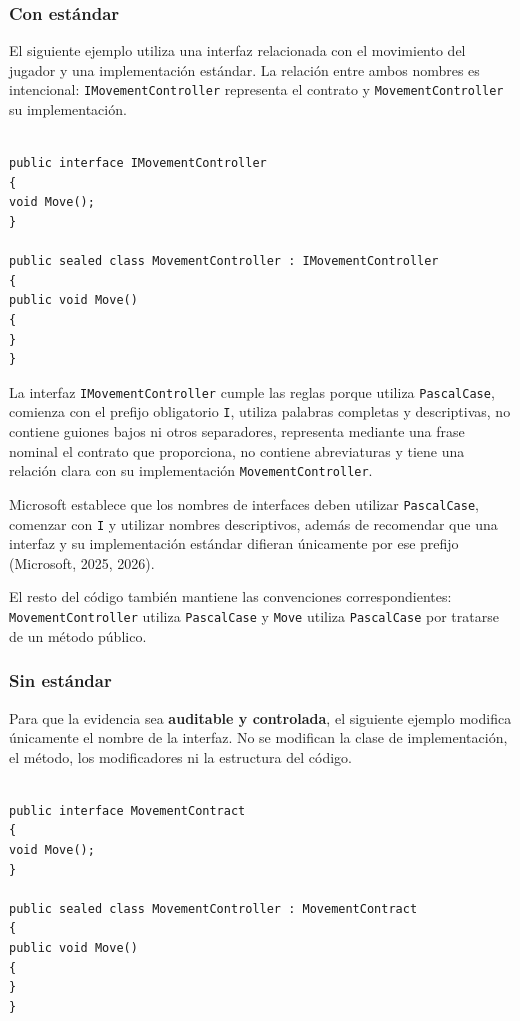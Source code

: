 \subsubsection{Con estándar}

El siguiente ejemplo utiliza una interfaz relacionada con el movimiento del jugador y una implementación estándar. La relación entre ambos nombres es intencional: \texttt{IMovementController} representa el contrato y \texttt{MovementController} su implementación.

\begin{lstlisting}[style=csharpstyle]

public interface IMovementController
{
void Move();
}

public sealed class MovementController : IMovementController
{
public void Move()
{
}
}

\end{lstlisting}

La interfaz \texttt{IMovementController} cumple las reglas porque utiliza \texttt{PascalCase}, comienza con el prefijo obligatorio \texttt{I}, utiliza palabras completas y descriptivas, no contiene guiones bajos ni otros separadores, representa mediante una frase nominal el contrato que proporciona, no contiene abreviaturas y tiene una relación clara con su implementación \texttt{MovementController}.

Microsoft establece que los nombres de interfaces deben utilizar \texttt{PascalCase}, comenzar con \texttt{I} y utilizar nombres descriptivos, además de recomendar que una interfaz y su implementación estándar difieran únicamente por ese prefijo (Microsoft, 2025, 2026).

El resto del código también mantiene las convenciones correspondientes: \texttt{MovementController} utiliza \texttt{PascalCase} y \texttt{Move} utiliza \texttt{PascalCase} por tratarse de un método público.

\subsubsection{Sin estándar}

Para que la evidencia sea \textbf{auditable y controlada}, el siguiente ejemplo modifica únicamente el nombre de la interfaz. No se modifican la clase de implementación, el método, los modificadores ni la estructura del código.

\begin{lstlisting}[style=csharpstyle]

public interface MovementContract
{
void Move();
}

public sealed class MovementController : MovementContract
{
public void Move()
{
}
}

\end{lstlisting}

